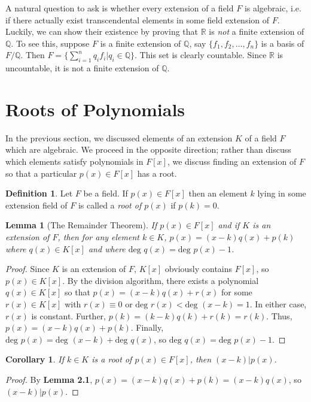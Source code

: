 \documentclass[12pt,leqno]{article}
\numberwithin{equation}{section}
\theoremstyle{plain}
\newtheorem{lem}[thm]{Lemma}
\newtheorem{cor}[thm]{Corollary}
\theoremstyle{definition}
\newtheorem*{Def}{Definition}
\theoremstyle{remark}
\begin{document}
A natural question to ask is whether every extension of a field $F$ is algebraic, i.e. if there actually exist transcendental elements in some field extension of $F$. Luckily, we can show their existence by proving that $\mathbb{R}$ is \textit{not} a finite extension of $\mathbb{Q}$. To see this, suppose $F$ is a finite extension of $\mathbb{Q}$, say $\{f_1,f_2,\hdots,f_n\}$ is a basis of $F/\mathbb{Q}$. Then $F=\{\sum_{i=1}^nq_if_i|q_i\in\mathbb{Q}\}$. This set is clearly countable. Since $\mathbb{R}$ is uncountable, it is not a finite extension of $\mathbb{Q}$.

\section{Roots of Polynomials}
In the previous section, we discussed elements of an extension $K$ of a field $F$ which are algebraic. We proceed in the opposite direction; rather than discuss which elements satisfy polynomials in $F[x]$, we discuss finding an extension of $F$ so that a particular $p(x)\in F[x]$ has a root. 

\begin{Def}
 Let $F$ be a field. If $p(x)\in F[x]$ then an element $k$ lying in some extension field of $F$ is called a \textit{root of $p(x)$} if $p(k)=0$.  
\end{Def}

\begin{lem}[The Remainder Theorem]
 If $p(x)\in F[x]$ and if $K$ is an extension of $F$, then for any element $k\in K$, $p(x)=(x-k)q(x)+p(k)$ where $q(x)\in K[x]$ and where $\text{deg }q(x)=\text{deg }p(x)-1$. 
\end{lem}

\begin{proof}
 Since $K$ is an extension of $F$, $K[x]$ obviously contains $F[x]$, so $p(x)\in K[x]$. By the division algorithm, there exists a polynomial $q(x)\in K[x]$ so that $p(x)=(x-k)q(x)+r(x)$ for some $r(x)\in K[x]$ with $r(x)\equiv0$ or $\text{deg }r(x)<\text{deg }(x-k)=1$. In either case, $r(x)$ is constant. Further, $p(k)=(k-k)q(k)+r(k)=r(k)$. Thus, $p(x)=(x-k)q(x)+p(k)$. Finally, $\text{deg }p(x)=\text{deg }(x-k)+\text{deg }q(x)$, so $\text{deg }q(x)=\text{deg }p(x)-1$. 
\end{proof}

\begin{cor}
 If $k\in K$ is a root of $p(x)\in F[x]$, then $(x-k)|p(x)$. 
\end{cor}

\begin{proof}
 By \textbf{Lemma 2.1}, $p(x)=(x-k)q(x)+p(k)=(x-k)q(x)$, so $(x-k)|p(x)$.
\end{proof}
\end{document}
